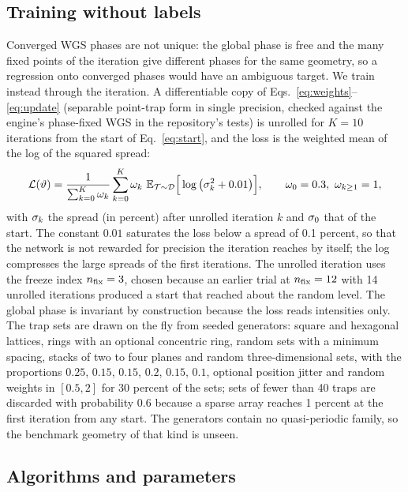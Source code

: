 \subsection{Training without labels}\label{sec:training}

Converged WGS phases are not unique: the global phase is free and the many fixed points of the iteration give different phases for the same geometry, so a regression onto converged phases would have an ambiguous target. We train instead through the iteration. A differentiable copy of Eqs.~\eqref{eq:weights}--\eqref{eq:update} (separable point-trap form in single precision, checked against the engine's phase-fixed WGS in the repository's tests) is
unrolled for $K=10$ iterations from the start of Eq.~\eqref{eq:start}, and the loss is the weighted mean of the log of the squared spread:
\begin{equation}
\mathcal L(\vartheta)=\frac{1}{\sum_{k=0}^{K}\omega_k}\sum_{k=0}^{K}\omega_k\ \mathbb E_{\mathcal T\sim\mathcal D}\Big[\log\big(\relstd_k^2+0.01\big)\Big],\qquad \omega_0=0.3,\ \omega_{k\ge1}=1,
\label{eq:loss}
\end{equation}
with $\sigma_k$ the spread (in percent) after unrolled iteration $k$ and $\sigma_0$ that of the start. The constant $0.01$ saturates the loss below a spread of 0.1 percent, so that the network is not rewarded for precision the iteration reaches by itself; the log compresses the large spreads of the first iterations. The unrolled iteration uses the freeze index $n_{\mathrm{fix}}=3$, chosen because an earlier trial at
$n_{\mathrm{fix}}=12$ with 14 unrolled iterations produced a start that reached about the random level. The global phase is invariant by construction because the loss reads intensities only. The trap sets are drawn on the fly from seeded generators: square and hexagonal lattices, rings with an optional concentric ring, random sets with a minimum spacing, stacks of two to four planes and random three-dimensional sets, with the proportions
$0.25$, $0.15$, $0.15$, $0.2$, $0.15$, $0.1$, optional position jitter and random weights in $[0.5,2]$ for 30 percent of the sets; sets of fewer than 40 traps are discarded with probability $0.6$ because a sparse array reaches 1 percent at the first iteration from any start. The generators contain no quasi-periodic family, so the benchmark geometry of that kind is unseen.

\subsection{Algorithms and parameters}\label{sec:algorithm}

